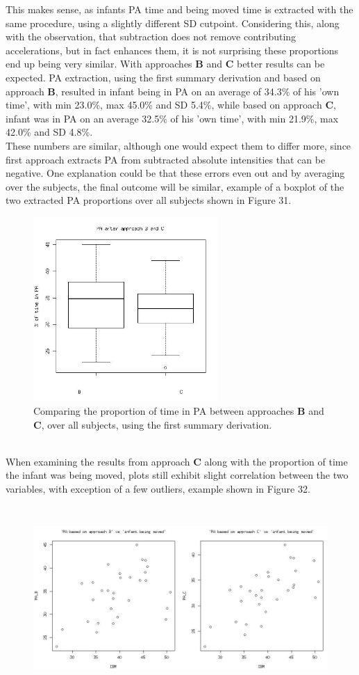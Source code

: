 \documentclass{article}
\begin{document}
{This makes sense, as infants PA time and being moved time is extracted with the same procedure, using a slightly different SD cutpoint. Considering this, along with the observation, that subtraction does not remove contributing accelerations, but in fact enhances them, it is not surprising these proportions end up being very similar. With approaches \textbf{B} and \textbf{C} better results can be expected. PA extraction, using the first summary derivation and based on approach \textbf{B}, resulted in infant being in PA on an average of 34.3\% of his 'own time', with min 23.0\%, max 45.0\% and SD 5.4\%, while based on approach \textbf{C}, infant was in PA on an average 32.5\% of his 'own time', with min 21.9\%, max 42.0\% and SD 4.8\%. \\These numbers are similar, although one would expect them to differ more, since first approach extracts PA from subtracted absolute intensities that can be negative. One explanation could be that these errors even out and by averaging over the subjects, the final outcome will be similar, example of a boxplot of the two extracted PA proportions over all subjects shown in Figure 31.
\begin{figure}[h]
\includegraphics[width=7cm, height=7cm]{boxplotPABC.jpg}
\caption{Comparing the proportion of time in PA between approaches \textbf{B} and \textbf{C}, over all subjects, using the first summary derivation.}
\end{figure}
\\
 When examining the results from approach \textbf{C} along with the proportion of time the infant was being moved, plots still exhibit slight correlation between the two variables, with exception of a few outliers, example shown in Figure 32. 
\begin{figure}[h]
\includegraphics[width=14cm, height=7cm]{corrPABPACIBM.png}

\end{figure}}
\end{document}
